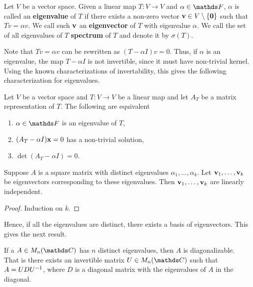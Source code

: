 \documentclass{article}
\begin{document}
\begin{definition}
Let $V$ be a vector space. Given a linear map $T \colon V \to V$ and $\alpha \in \F$, $\alpha$ is called an \textbf{eigenvalue} of $T$ if there exists a non-zero vector ${\mathbf{v}} \in V\setminus\{{\mathbf{0}}\}$ such that $Tv = \alpha v$. We call such ${\mathbf{v}}$ an \textbf{eigenvector} of $T$ with eigenvalue $\alpha$. We call the set of all eigenvalues of $T$ \textbf{spectrum} of $T$ and denote it by $\sigma(T)$.
\end{definition}


Note that $Tv = \alpha v$ can be rewritten as $(T-\alpha I)v = 0$. Thus, if $\alpha $ is an eigenvalue, the map $T-\alpha I$ is not invertible, since it must have non-trivial kernel. Using the known characterizations of invertability, this gives the following characterization for eigenvalues. 

\begin{theorem}
Let $V$ be a vector space and $T \colon V \to V$ be a linear map and let $A_T$ be a matrix representation of $T$. The following are equivalent
\begin{enumerate}
    \item $\alpha\in \F$ is an eigenvalue of $T$,
    \item $(A_T-\alpha I)\mathbf{x} = 0$ has a non-trivial solution,
    \item $\det (A_T-\alpha I) = 0$.
\end{enumerate}
\end{theorem}

\begin{theorem}
Suppose $A$ is a square matrix with distinct eigenvalues $\alpha_1, \ldots, \alpha_k$. Let ${\mathbf{v}}_1, \ldots, {\mathbf{v}}_k$ be eigenvectors corresponding to these eigenvalues. Then ${\mathbf{v}}_1, \ldots, {\mathbf{v}}_k$ are linearly independent.
\end{theorem}

\begin{proof}
Induction on $k$.
\end{proof}

Hence, if all the eigenvalues are distinct, there exists a basis of eigenvectors. This gives the next result. 

\begin{corollary}
If a $A\in M_n(\C)$ has $n$ distinct eigenvalues, then $A$ is diagonalizable. That is there exists an invertible matrix $U\in M_n(\C)$ such that $A = UDU^{-1}$, where $D$ is a diagonal matrix with the eigenvalues of $A$ in the diagonal.
\end{corollary}
\end{document}
